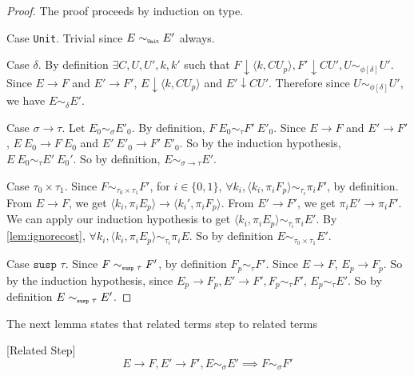\begin{proof}
  The proof proceeds by induction on type.
  
  Case \texttt{Unit}. Trivial since $E \sim_{\texttt{\tiny{Unit}}} E'$ always.

  Case $\delta$.
  By definition $\exists C, U, U', k, k'$ such that $F \downarrow \langle k, C U_p \rangle, F' \downarrow C U', U \sim_{\phi[\delta]} U'$.
  Since $E \to F$ and $E' \to F'$, $E \downarrow \langle k, C U_p \rangle$ and $E' \downarrow C U'$.
  Therefore since $U \sim_{\phi[\delta]} U'$, we have $E \sim_\delta E'$.

  Case $\sigma \to \tau$.
  Let $E_0 \sim_\sigma E'_0$.
  By definition, $F\ E_0 \sim_\tau F'\ E'_0$.
  Since $E \to F$ and $E' \to F'$, $E\ E_0 \to F\ E_0$ and $E'\ E'_0 \to F'\ E'_0$.
  So by the induction hypothesis, $E\ E_0 \sim_\tau E'\ E_0'$.
  So by definition, $E \sim_{\sigma \to \tau} E'$.

  Case $\tau_0 \times \tau_1$.
  Since $F \sim_{\tau_0 \times \tau_1} F'$, for $i\in\{0, 1\}$,  $\forall k_i, \langle k_i, \pi_i F_p \rangle \sim_{\tau_i} \pi_i F'$, by definition.
  From $E \to F$, we get $\langle k_i, \pi_i E_p \rangle \to \langle k_i', \pi_i F_p \rangle$.
  From $E' \to F'$, we get $\pi_i E' \to \pi_i F'$.
  We can apply our induction hypothesis to get $\langle k_i, \pi_i E_p \rangle \sim_{\tau_i} \pi_i E'$.
  By \ref{lem:ignorecost}, $\forall k_i, \langle k_i, \pi_i E_p \rangle \sim_{\tau_i} \pi_i E$.
  So by definition $E \sim_{\tau_0 \times \tau_1} E'$.

  Case $\texttt{susp }\tau$.
  Since $F \sim_{\texttt{\tiny{susp }}\tau} F'$, by definition $F_p \sim_\tau F'$.
  Since $E \to F$, $E_p \to F_p$.
  So by the induction hypothesis, since $E_p \to F_p, E' \to F', F_p \sim_\tau F'$, $E_p \sim_\tau E'$.
  So by definition $E \sim_{\texttt{\tiny{susp }}\tau} E'$.

\end{proof}
%
The next lemma states that related terms step to related terms
%
\begin{lemma}
  \label{lem:relatedstep}[Related Step]
  \[ E \to F, E' \to F', E \sim_\sigma E' \implies F \sim_\sigma F' \]
\end{lemma}
%
